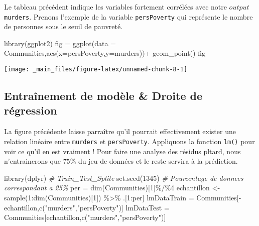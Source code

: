 \documentclass[
]{book}
\newenvironment{Shaded}{\begin{snugshade}}{\end{snugshade}}
\newcommand{\AttributeTok}[1]{\textcolor[rgb]{0.77,0.63,0.00}{#1}}
\newcommand{\CommentTok}[1]{\textcolor[rgb]{0.56,0.35,0.01}{\textit{#1}}}
\newcommand{\DecValTok}[1]{\textcolor[rgb]{0.00,0.00,0.81}{#1}}
\newcommand{\FunctionTok}[1]{\textcolor[rgb]{0.00,0.00,0.00}{#1}}
\newcommand{\NormalTok}[1]{#1}
\newcommand{\OtherTok}[1]{\textcolor[rgb]{0.56,0.35,0.01}{#1}}
\newcommand{\SpecialCharTok}[1]{\textcolor[rgb]{0.00,0.00,0.00}{#1}}
\newcommand{\StringTok}[1]{\textcolor[rgb]{0.31,0.60,0.02}{#1}}
\begin{document}
Le tableau précédent indique les variables fortement corrélées avec notre \(output\) \texttt{murders}. Prenons l'exemple de la variable \texttt{persPoverty} qui représente le nombre de personnes sous le seuil de pauvreté.\\

\begin{Shaded}
\begin{Highlighting}[]
\FunctionTok{library}\NormalTok{(ggplot2)}
\NormalTok{fig }\OtherTok{=} \FunctionTok{ggplot}\NormalTok{(}\AttributeTok{data =}\NormalTok{ Communities,}\FunctionTok{aes}\NormalTok{(}\AttributeTok{x=}\NormalTok{persPoverty,}\AttributeTok{y=}\NormalTok{murders))}\SpecialCharTok{+}
  \FunctionTok{geom\_point}\NormalTok{()}
\NormalTok{fig}
\end{Highlighting}
\end{Shaded}

\begin{center}\texttt{[image: \_main\_files/figure-latex/unnamed-chunk-8-1]} \end{center}

\hypertarget{entrauxeenement-de-moduxe8le-droite-de-ruxe9gression}{%
\subsection*{Entraînement de modèle \& Droite de régression}\label{entrauxeenement-de-moduxe8le-droite-de-ruxe9gression}}

La figure précédente laisse parraître qu'il pourrait effectivement exister une relation linéaire entre \texttt{murders} et \texttt{persPoverty}. Appliquons la fonction \texttt{lm()} pour voir ce qu'il en est vraiment ! Pour faire une analyse des résidus pltard, nous n'entrainerons que \(75\%\) du jeu de données et le reste servira à la prédiction.\\

\begin{Shaded}
\begin{Highlighting}[]
\FunctionTok{library}\NormalTok{(dplyr)}
\CommentTok{\# Train\_Test\_Splite}
\FunctionTok{set.seed}\NormalTok{(}\DecValTok{1345}\NormalTok{)}
\CommentTok{\# Pourcentage de donnees correspondant a 25\%}
\NormalTok{per }\OtherTok{=} \FunctionTok{dim}\NormalTok{(Communities)[}\DecValTok{1}\NormalTok{]}\SpecialCharTok{\%/\%}\DecValTok{4}
\NormalTok{echantillon }\OtherTok{\textless{}{-}} \FunctionTok{sample}\NormalTok{(}\DecValTok{1}\SpecialCharTok{:}\FunctionTok{dim}\NormalTok{(Communities)[}\DecValTok{1}\NormalTok{]) }\SpecialCharTok{\%\textgreater{}\%}\NormalTok{ .[}\DecValTok{1}\SpecialCharTok{:}\NormalTok{per]}
\NormalTok{lmDataTrain }\OtherTok{=}\NormalTok{ Communities[}\SpecialCharTok{{-}}\NormalTok{echantillon,}\FunctionTok{c}\NormalTok{(}\StringTok{"murders"}\NormalTok{,}\StringTok{"persPoverty"}\NormalTok{)]}
\NormalTok{lmDataTest }\OtherTok{=}\NormalTok{ Communities[echantillon,}\FunctionTok{c}\NormalTok{(}\StringTok{"murders"}\NormalTok{,}\StringTok{"persPoverty"}\NormalTok{)]}
\end{Highlighting}
\end{Shaded}
\end{document}
